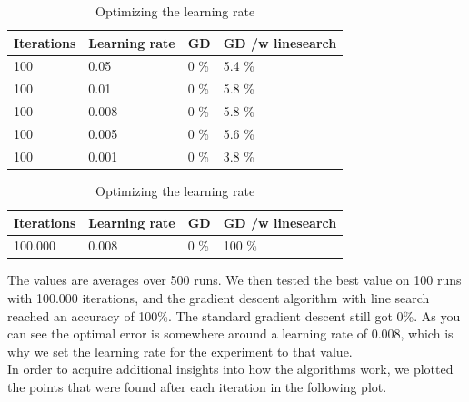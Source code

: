 \documentclass{article}
\begin{document}
\begin{table}[H]
    \parbox{.45\linewidth}{
	\centering
		\begin{tabular}{|l|l|l|l|}
        \hline
		Iterations & Learning rate & GD & GD /w linesearch \\ \hline 
		100 & 0.05 & 0 \% & 5.4 \% \\ \hline
		100 & 0.01 & 0 \% & 5.8 \% \\ \hline
		100 & 0.008 & 0 \% & 5.8 \% \\ \hline
		100 & 0.005 & 0 \% & 5.6 \% \\ \hline
		100 & 0.001 & 0 \% & 3.8 \% \\ \hline
		\end{tabular}
    }
    \hfill
    \parbox{.45\linewidth}{
	\centering
		\begin{tabular}{|l|l|l|l|}
        \hline
		Iterations & Learning rate & GD & GD /w linesearch \\ \hline 
		100.000 & 0.008 & 0 \% & 100 \% \\ \hline
		\end{tabular}
    }
    \caption{Optimizing the learning rate}
    \label{tab:learningrate}
\end{table}
    
The values are averages over 500 runs. We then tested the best value on 100 runs with 100.000 iterations, and the gradient descent algorithm with line search reached an accuracy of 100\%. The standard gradient descent still got 0\%.
As you can see the optimal error is somewhere around a learning rate of 0.008, which is why we set the learning rate for the experiment to that value. \\

\newpage
In order to acquire additional insights into how the algorithms work, we plotted the points that were found after each iteration in the following plot.
\end{document}
